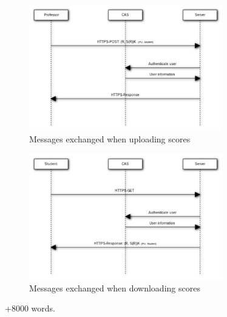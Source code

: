\documentclass{article}
\begin{document}
\begin{figure}
\begin{center}
\includegraphics[width=0.75\textwidth]{images/upload_scores.pdf}
\caption{Messages exchanged when uploading scores}
\label{fig:upload-scores}
\end{center}
\end{figure}

\begin{figure}
\begin{center}
\includegraphics[width=0.75\textwidth]{images/download_scores.pdf}
\caption{Messages exchanged when downloading scores}
\label{fig:download-scores}
\end{center}
\end{figure}

+8000 words.
\end{document}
